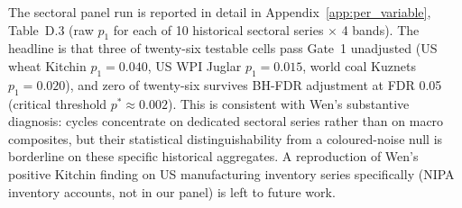 The sectoral panel run is reported in detail in
Appendix~\ref{app:per_variable}, Table~D.3 (raw \(p_1\) for
each of 10 historical sectoral series \(\times\) 4 bands). The
headline is that three of twenty-six testable cells pass
Gate~1 unadjusted (US wheat Kitchin \(p_1=0.040\), US WPI
Juglar \(p_1=0.015\), world coal Kuznets \(p_1=0.020\)), and
zero of twenty-six survives BH-FDR adjustment at FDR 0.05
(critical threshold \(p^*\approx 0.002\)). This is consistent
with Wen's substantive diagnosis: cycles concentrate on
dedicated sectoral series rather than on macro composites, but
their statistical distinguishability from a coloured-noise
null is borderline on these specific historical aggregates.
A reproduction of Wen's positive Kitchin finding on US
manufacturing inventory series specifically (NIPA inventory
accounts, not in our panel) is left to future work.
